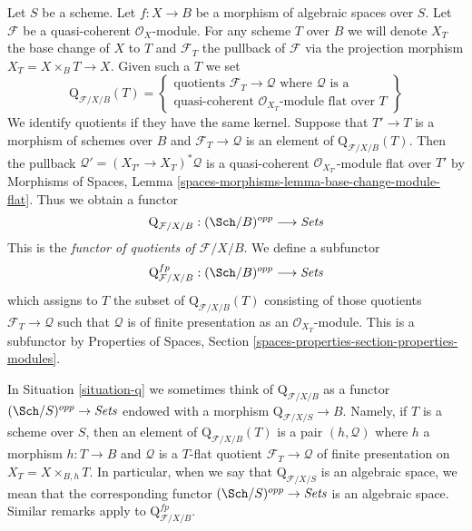 \begin{situation}
\label{situation-q}
Let $S$ be a scheme. Let $f : X \to B$ be a morphism of algebraic spaces
over $S$. Let $\mathcal{F}$ be a quasi-coherent $\mathcal{O}_X$-module.
For any scheme $T$ over $B$ we will denote $X_T$ the base change of
$X$ to $T$ and $\mathcal{F}_T$ the pullback
of $\mathcal{F}$ via the projection morphism $X_T = X \times_B T \to X$.
Given such a $T$ we set
$$
\text{Q}_{\mathcal{F}/X/B}(T) =
\left\{
\begin{matrix}
\text{quotients }\mathcal{F}_T \to \mathcal{Q}\text{ where }
\mathcal{Q}\text{ is a}\\
\text{quasi-coherent }
\mathcal{O}_{X_T}\text{-module flat over }T
\end{matrix}
\right\}
$$
We identify quotients if they have the same kernel. Suppose
that $T' \to T$ is a morphism of schemes over $B$ and
$\mathcal{F}_T \to \mathcal{Q}$ is an element of
$\text{Q}_{\mathcal{F}/X/B}(T)$. Then the pullback
$\mathcal{Q}' = (X_{T'} \to X_T)^*\mathcal{Q}$ is a quasi-coherent
$\mathcal{O}_{X_{T'}}$-module flat over $T'$ by
Morphisms of Spaces, Lemma
\ref{spaces-morphisms-lemma-base-change-module-flat}.
Thus we obtain a functor
\begin{equation}
\label{equation-q}
\text{Q}_{\mathcal{F}/X/B} : (\Sch/B)^{opp} \longrightarrow \textit{Sets}
\end{equation}
This is the {\it functor of quotients of $\mathcal{F}/X/B$}.
We define a subfunctor
\begin{equation}
\label{equation-q-fp}
\text{Q}^{fp}_{\mathcal{F}/X/B} : (\Sch/B)^{opp} \longrightarrow \textit{Sets}
\end{equation}
which assigns to $T$ the subset of $\text{Q}_{\mathcal{F}/X/B}(T)$
consisting of those quotients $\mathcal{F}_T \to \mathcal{Q}$
such that $\mathcal{Q}$ is of finite presentation as an
$\mathcal{O}_{X_T}$-module. This is a subfunctor by
Properties of Spaces, Section
\ref{spaces-properties-section-properties-modules}.
\end{situation}

\noindent
In Situation \ref{situation-q} we sometimes think of
$\text{Q}_{\mathcal{F}/X/B}$ as a functor
$(\Sch/S)^{opp} \to \textit{Sets}$ endowed
with a morphism $\text{Q}_{\mathcal{F}/X/S} \to B$.
Namely, if $T$ is a scheme over $S$, then an element
of $\text{Q}_{\mathcal{F}/X/B}(T)$ is a pair $(h, \mathcal{Q})$
where $h$ a morphism $h : T \to B$
and $\mathcal{Q}$ is a $T$-flat quotient $\mathcal{F}_T \to \mathcal{Q}$
of finite presentation on $X_T = X \times_{B, h} T$. In particular, when we say
that $\text{Q}_{\mathcal{F}/X/S}$ is an algebraic space, we mean that the
corresponding functor $(\Sch/S)^{opp} \to \textit{Sets}$ is an algebraic space.
Similar remarks apply to $\text{Q}^{fp}_{\mathcal{F}/X/B}$.


